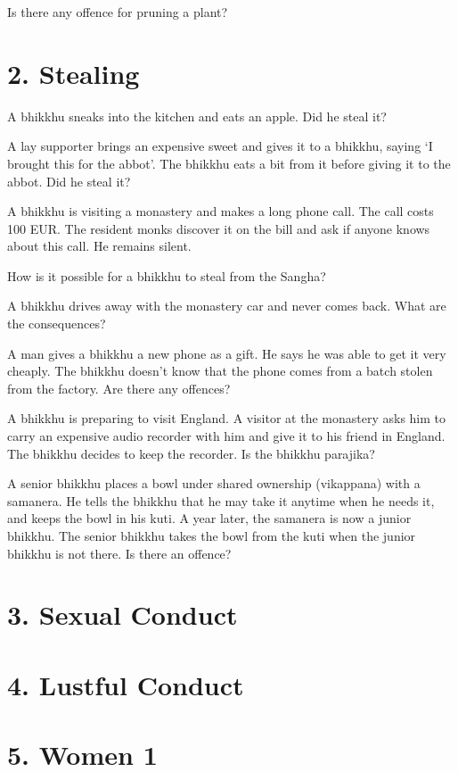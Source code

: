 Is there any offence for pruning a plant?

\section{2. Stealing}

A bhikkhu sneaks into the kitchen and eats an apple. Did he steal it?

A lay supporter brings an expensive sweet and gives it to a bhikkhu,
saying `I brought this for the abbot'. The bhikkhu eats a bit from it
before giving it to the abbot. Did he steal it?

A bhikkhu is visiting a monastery and makes a long phone call. The call
costs 100 EUR. The resident monks discover it on the bill and ask if
anyone knows about this call. He remains silent.

How is it possible for a bhikkhu to steal from the Sangha?

A bhikkhu drives away with the monastery car and never comes back. What
are the consequences?

A man gives a bhikkhu a new phone as a gift. He says he was able to get
it very cheaply. The bhikkhu doesn't know that the phone comes from a
batch stolen from the factory. Are there any offences?

A bhikkhu is preparing to visit England. A visitor at the monastery asks
him to carry an expensive audio recorder with him and give it to his
friend in England. The bhikkhu decides to keep the recorder. Is the
bhikkhu parajika?

A senior bhikkhu places a bowl under shared ownership (vikappana) with a
samanera. He tells the bhikkhu that he may take it anytime when he needs
it, and keeps the bowl in his kuti. A year later, the samanera is now a
junior bhikkhu. The senior bhikkhu takes the bowl from the kuti when the
junior bhikkhu is not there. Is there an offence?

\section{3. Sexual Conduct}

\section{4. Lustful Conduct}

\section{5. Women 1}

